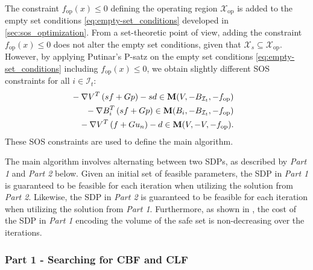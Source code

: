 The constraint $f_\text{op}(x) \leq 0$ defining the operating region $\mathcal X_\text{op}$ is added to the empty set conditions \cref{eq:empty-set_conditions} developed in \cref{sec:sos_optimization}.
From a set-theoretic point of view, adding the constraint $f_\text{op}(x) \leq 0$ does not alter the empty set conditions, given that $\mathcal X_s \subseteq \mathcal X_\text{op}$.
However, by applying Putinar's P-satz on the empty set conditions \cref{eq:empty-set_conditions} including $f_\text{op}(x) \leq 0$, we obtain slightly different SOS constraints for all $i \in \mathcal I_t$:
\begin{subequations} \label{eq:sos_constraint_roi}
   \begin{align}
      \begin{split}
         &-\nabla V^T \left ( s f + G p \right ) - s d \in \textbf M(V, -B_{\mathcal I_t}, -f_\text{op})
      \end{split} \\
      \begin{split}
         &-\nabla B_i^T \left ( s f + G p \right ) \in \textbf M(B_i, -B_{\mathcal I_t}, -f_\text{op})  
      \end{split} \\
      \begin{split}
         &-\nabla V^T \left ( f + G u_n \right ) - d \in \textbf M(V, -V, -f_\text{op}).
      \end{split}
   \end{align}
\end{subequations}
These SOS constraints are used to define the main algorithm.

The main algorithm involves alternating between two SDPs, as described by \textit{Part 1} and \textit{Part 2} below.
Given an initial set of feasible parameters, the SDP in \textit{Part 1} is guaranteed to be feasible for each iteration when utilizing the solution from \textit{Part 2}.
Likewise, the SDP in \textit{Part 2} is guaranteed to be feasible for each iteration when utilizing the solution from \textit{Part 1}.
Furthermore, as shown in \cite{schneeberger2023sos}, the cost of the SDP in \textit{Part 1} encoding the volume of the safe set is non-decreasing over the iterations.



\subsubsection*{Part 1 - Searching for CBF and CLF}

